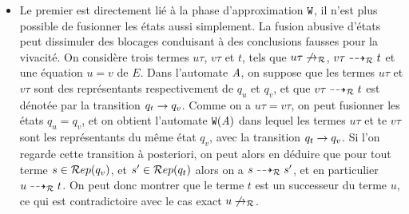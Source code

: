 \begin{itemize}
\item Le premier est directement lié à la phase d'approximation $\mathtt{W}$,
  il n'est plus possible de fusionner les états aussi simplement.
  La fusion abusive d'états peut dissimuler des blocages conduisant à des conclusions fausses pour la vivacité.
  On considère trois termes $u\tau$, $v\tau$ et $t$, tels que $u\tau \not\rightarrow_\mathcal R$, $v\tau \dashrightarrow_\mathcal R t$ et 
  une équation $u = v$ de $E$.
  Dans l'automate $\mathit A$, on suppose que les termes $u\tau$ et $v\tau$ sont des représentants respectivement de $q_u$ et $q_v$,
  et que $v\tau \dashrightarrow_\mathcal R t$ est dénotée par la transition $q_t \rightarrow q_v$. Comme on a $u\tau = v\tau$, 
  on peut fusionner les états $q_u = q_v$, et on obtient l'automate $\mathtt{W}(\mathit A)$ dans lequel les termes
  $u\tau$ et te $v\tau$ sont les représentants du même état $q_v$,
  avec la transition $q_t \rightarrow q_v$. Si l'on regarde cette transition à posteriori, on peut alors en déduire
  que pour tout terme $s \in \mathcal R ep(q_v)$, et $s' \in \mathcal R ep(q_t)$ alors on a $s \dashrightarrow_\mathcal R s'$, et
  en particulier $u \dashrightarrow_\mathcal R t$. On peut donc montrer que le terme $t$ est un successeur du terme
  $u$, ce qui est contradictoire avec le cas exact $u \not\rightarrow_\mathcal R$.


\end{itemize}
